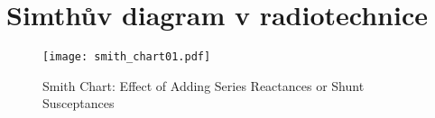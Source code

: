 \setchaptertoc
\chapter{Simthův diagram v radiotechnice}\label{chap:ra_smith}


    \begin{figure}[ht!]  %
      \centering
      \texttt{[image: smith\_chart01.pdf]}
      \caption{Smith Chart: Effect of Adding Series Reactances or Shunt Susceptances 
               \cite[s.~45]{IEEEStearns2001}}
      \label{fig_RA:smith01}
    \end{figure}
    
